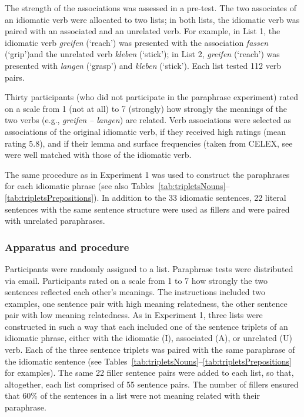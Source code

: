 \documentclass[output=paper]{langsci/langscibook}
\begin{document}
The strength of the associations was assessed in a pre-test. The two associates of an idiomatic verb were allocated to two lists; in both lists, the idiomatic verb was paired with an associated and an unrelated verb.  For example, in List 1, the idiomatic verb \textit{greifen} (‘reach’) was presented with the association \textit{fassen} (‘grip’)and the unrelated verb \textit{kleben} (‘stick’); in List 2, \textit{greifen} (‘reach’) was presented with \textit{langen} (‘grasp’) and \textit{kleben} (‘stick’). Each list tested 112 verb pairs. 

Thirty participants (who did not participate in the paraphrase experiment) rated on a scale from 1 (not at all) to 7 (strongly) how strongly the meanings of the two verbs (e.g., \textit{greifen – langen}) are related. Verb associations were selected as associations of the original idiomatic verb, if they received high ratings (mean rating 5.8), and if their lemma and surface frequencies (taken from CELEX, see \citep{baayen:1993} were well matched with those of the idiomatic verb. 

 The same procedure as in Experiment 1 was used to construct the paraphrases for each idiomatic phrase (see also Tables~\ref{tab:tripletsNouns}--\ref{tab:tripletsPrepositions}). In addition to the 33 idiomatic sentences, 22 literal sentences with the same sentence structure were used as fillers and were paired with unrelated paraphrases. 

\subsubsection{Apparatus and procedure}

Participants were randomly assigned to a list. Paraphrase tests were distributed via email. Participants rated on a scale from 1 to 7 how strongly the two sentences reflected each other’s meanings. The instructions included two examples, one sentence pair with high meaning relatedness, the other sentence pair with low meaning relatedness. 
As in Experiment 1, three lists were constructed in such a way that each included one of the sentence triplets of an idiomatic phrase, either with the idiomatic (I), associated (A), or unrelated (U) verb. Each of the three sentence triplets was paired with the same paraphrase of the idiomatic sentence (see Tables~\ref{tab:tripletsNouns}--\ref{tab:tripletsPrepositions} for examples). The same 22 filler sentence pairs were added to each list, so that, altogether, each list comprised of 55 sentence pairs. The number of fillers ensured that 60\% of the sentences in a list were not meaning related with their paraphrase. 
\end{document}

